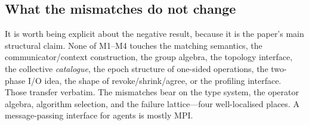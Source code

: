 \subsection{What the mismatches do not change}

It is worth being explicit about the negative result, because it is the
paper's main structural claim. None of M1--M4 touches the matching
semantics, the communicator/context construction, the group algebra, the
topology interface, the collective \emph{catalogue}, the epoch structure of
one-sided operations, the two-phase I/O idea, the shape of
revoke/shrink/agree, or the profiling interface. Those transfer verbatim.
The mismatches bear on the type system, the operator algebra, algorithm
selection, and the failure lattice---four well-localised places. A
message-passing interface for agents is mostly MPI.
